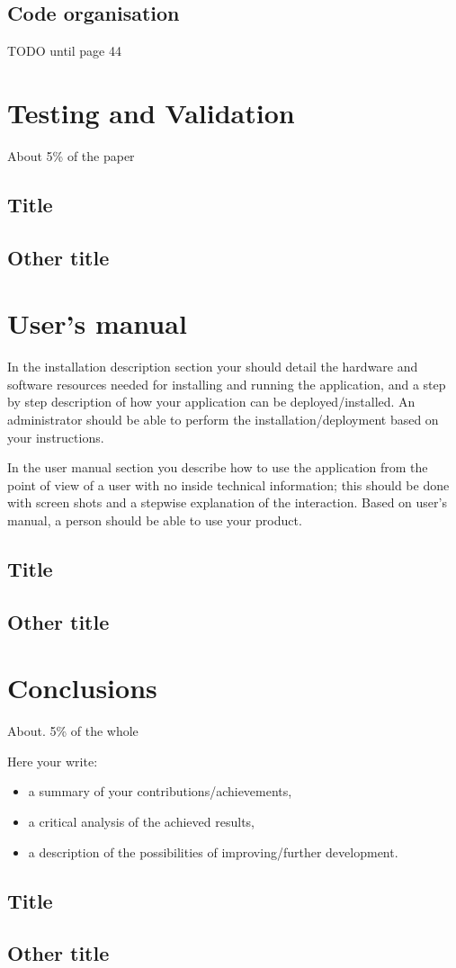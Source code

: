 \documentclass[12pt,a4paper,twoside]{report}
\begin{document}
\section{Code organisation}
{\color{red} TODO until page 44
}

\chapter{Testing and Validation}

About 5\% of the paper
\section{Title}
\section{Other title}

\chapter{User's manual}

In the installation description section your should detail the hardware and software resources needed for installing and running the application, and a step by step description of how your application can be deployed/installed. An administrator should be able to perform the installation/deployment based on your instructions.

In the user manual section you describe how to use the application from the point of view of a user with no inside technical information; this should be done with screen shots and a stepwise explanation of the interaction. Based on user's manual, a person should be able to use your product.

\section{Title}
\section{Other title}

\chapter{Conclusions}

About. 5\% of the whole

Here your write:
\begin{itemize}
\item a summary of your contributions/achievements,
\item a critical analysis of the achieved results,
\item a description of the possibilities of improving/further development.
\end{itemize}
\section{Title}
\section{Other title}


 


\end{document}
